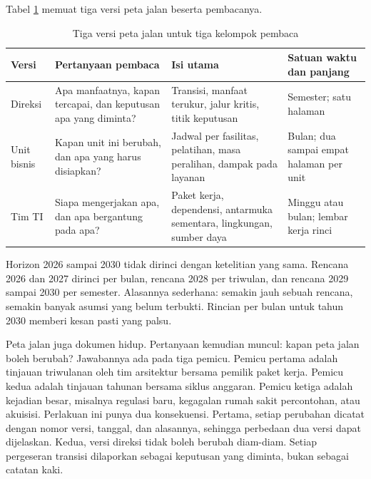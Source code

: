 Tabel \ref{tab:ch12-tiga-versi} memuat tiga versi peta jalan beserta
pembacanya.

\begin{table}[!htb]
  \centering
  \caption{Tiga versi peta jalan untuk tiga kelompok pembaca}
  \label{tab:ch12-tiga-versi}
  \begin{tabularx}{\textwidth}{>{\raggedright\arraybackslash}p{1.7cm}
                               >{\raggedright\arraybackslash}X
                               >{\raggedright\arraybackslash}X
                               >{\raggedright\arraybackslash}p{2.0cm}}
    \hline
    \textbf{Versi} & \textbf{Pertanyaan pembaca} & \textbf{Isi utama} &
      \textbf{Satuan waktu dan panjang} \\
    \hline
    Direksi & Apa manfaatnya, kapan tercapai, dan keputusan apa yang diminta? &
      Transisi, manfaat terukur, jalur kritis, titik keputusan & Semester;
      satu halaman \\
    \hline
    Unit bisnis & Kapan unit ini berubah, dan apa yang harus disiapkan? &
      Jadwal per fasilitas, pelatihan, masa peralihan, dampak pada layanan &
      Bulan; dua sampai empat halaman per unit \\
    \hline
    Tim TI & Siapa mengerjakan apa, dan apa bergantung pada apa? & Paket kerja,
      dependensi, antarmuka sementara, lingkungan, sumber daya & Minggu atau
      bulan; lembar kerja rinci \\
    \hline
  \end{tabularx}
\end{table}

Horizon 2026 sampai 2030 tidak dirinci dengan ketelitian yang sama. Rencana
2026 dan 2027 dirinci per bulan, rencana 2028 per triwulan, dan rencana 2029
sampai 2030 per semester. Alasannya sederhana: semakin jauh sebuah rencana,
semakin banyak asumsi yang belum terbukti. Rincian per bulan untuk tahun 2030
memberi kesan pasti yang palsu.

Peta jalan juga dokumen hidup. Pertanyaan kemudian muncul: kapan peta jalan
boleh berubah? Jawabannya ada pada tiga pemicu. Pemicu pertama adalah tinjauan
triwulanan oleh tim arsitektur bersama pemilik paket kerja. Pemicu kedua adalah
tinjauan tahunan bersama siklus anggaran. Pemicu ketiga adalah kejadian besar,
misalnya regulasi baru, kegagalan rumah sakit percontohan, atau akuisisi.
Perlakuan ini punya dua konsekuensi. Pertama, setiap perubahan dicatat dengan
nomor versi, tanggal, dan alasannya, sehingga perbedaan dua versi dapat
dijelaskan. Kedua, versi direksi tidak boleh berubah diam-diam. Setiap
pergeseran transisi dilaporkan sebagai keputusan yang diminta, bukan sebagai
catatan kaki.

